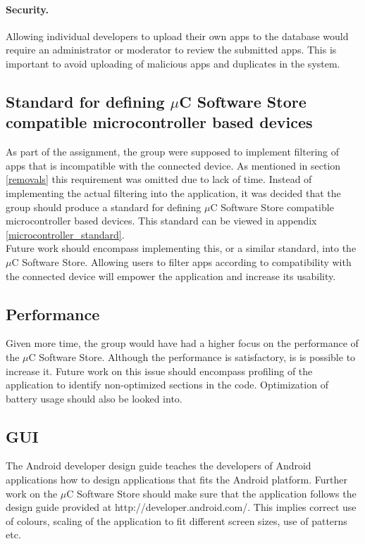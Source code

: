 	\paragraph{Security.} Allowing individual developers to upload their own apps to the database would require an administrator or moderator to review the submitted apps. This is important to avoid uploading of malicious apps and duplicates in the system.

	\subsection{Standard for defining $\mu$C Software Store compatible microcontroller based devices}
	As part of the assignment, the group were supposed to implement filtering of apps that is incompatible with the connected device. As mentioned in section \ref{removals} this requirement was omitted due to lack of time. Instead of implementing the actual filtering into the application, it was decided that the group should produce a standard for defining $\mu$C Software Store compatible microcontroller based devices. This standard can be viewed in appendix \ref{microcontroller_standard}. \\
	\newline
	Future work should encompass implementing this, or a similar standard, into the $\mu$C Software Store. Allowing users to filter apps according to compatibility with the connected device will empower the application and increase its usability. 

	\subsection{Performance}
	Given more time, the group would have had a higher focus on the performance of the $\mu$C Software Store. Although the performance is satisfactory, is is possible to increase it. Future work on this issue should encompass profiling of the application to identify non-optimized sections in the code. Optimization of battery usage should also be looked into.

	\subsection{GUI}
	The Android developer design guide teaches the developers of Android applications how to design applications that fits the Android platform. Further work on the $\mu$C Software Store should make sure that the application follows the design guide provided at http://developer.android.com/. This implies correct use of colours, scaling of the application to fit different screen sizes, use of patterns etc. 

